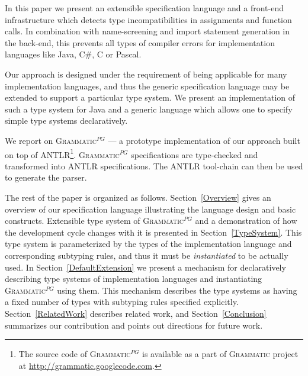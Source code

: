\documentclass{llncs2e/llncs}
\newcommand{\report}[1]{%
}%
\newcommand{\secref}[1]{Section~\ref{#1}}
\newcommand{\tool}[1]{\textsc{#1}}
\newcommand{\ATF}{\textsc{Grammatic}$^{PG}$}
\begin{document}
In this paper we present an extensible specification language and a front-end infrastructure which detects type incompatibilities in assignments and function calls. In combination with name-screening and import statement generation in the back-end, this prevents all types of compiler errors for implementation languages like Java, C\#, C or Pascal. 

Our approach is designed under the requirement of being applicable for many implementation languages, and thus the generic specification language may be extended to support a particular type system. We present an implementation of such a type system for Java and a generic language which allows one to specify simple type systems declaratively.

We report on \ATF{} --- a prototype implementation of our approach built on top of \tool{ANTLR}\footnote{The source code of \ATF{} is available as a part of \textsc{Grammatic} project at \url{http://grammatic.googlecode.com}.}. \ATF{} specifications are type-checked and transformed into \tool{ANTLR} specifications. The \tool{ANTLR} tool-chain can then be used to generate the parser. 

The rest of the paper is organized as follows. \secref{Overview} gives an overview of our specification language illustrating the language design and basic constructs. Extensible type system of \ATF{} and a demonstration of how the development cycle changes with it is presented in \secref{TypeSystem}. This type system is parameterized by the types of the implementation language and corresponding subtyping rules, and thus it must be \emph{instantiated} to be actually used. In \secref{DefaultExtension} we present a mechanism for declaratively describing type systems of implementation languages and instantiating \ATF{} using them. This mechanism describes the type systems as having a fixed number of types with subtyping rules specified explicitly. \report{To provide a better integration with a particular implementation language, one can write a custom extension. The extension mechanism and an example extension supporting Java are described in \secref{Java}. As we mentioned before, the front end provides an internal representation of a parser from which a back-end can generate error-free code. We show how the latter is done in our prototype in \secref{Backend}.} \secref{RelatedWork} describes related work, and \secref{Conclusion} summarizes our contribution and points out directions for future work.

\end{document}
